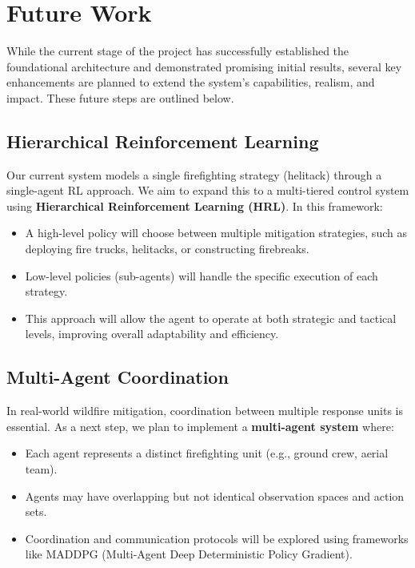 \documentclass[conference]{IEEEtran}
\begin{document}
\section{Future Work}

While the current stage of the project has successfully established the foundational architecture and demonstrated promising initial results, several key enhancements are planned to extend the system's capabilities, realism, and impact. These future steps are outlined below.

\subsection{Hierarchical Reinforcement Learning}
Our current system models a single firefighting strategy (helitack) through a single-agent RL approach. We aim to expand this to a multi-tiered control system using \textbf{Hierarchical Reinforcement Learning (HRL)}. In this framework:

\begin{itemize}
\item A high-level policy will choose between multiple mitigation strategies, such as deploying fire trucks, helitacks, or constructing firebreaks.
\item Low-level policies (sub-agents) will handle the specific execution of each strategy.
\item This approach will allow the agent to operate at both strategic and tactical levels, improving overall adaptability and efficiency.
\end{itemize}

\subsection{Multi-Agent Coordination}
In real-world wildfire mitigation, coordination between multiple response units is essential. As a next step, we plan to implement a \textbf{multi-agent system} where:

\begin{itemize}
\item Each agent represents a distinct firefighting unit (e.g., ground crew, aerial team).
\item Agents may have overlapping but not identical observation spaces and action sets.
\item Coordination and communication protocols will be explored using frameworks like MADDPG (Multi-Agent Deep Deterministic Policy Gradient).
\end{itemize}
\end{document}
